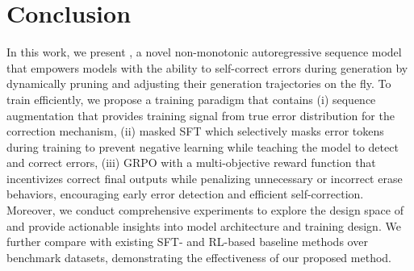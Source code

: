 \section{Conclusion}

In this work, we present \modelname, a novel non-monotonic autoregressive sequence model that empowers models with the ability to self-correct errors during generation by dynamically pruning and adjusting their generation trajectories on the fly.
To train \modelname efficiently, we propose a training paradigm that contains (i) sequence augmentation that provides training signal from true error distribution for the correction mechanism, (ii) masked SFT which selectively masks error tokens during training to prevent negative learning while teaching the model to detect and correct errors, (iii) GRPO with a multi-objective reward function that incentivizes correct final outputs while penalizing
unnecessary or incorrect erase behaviors, encouraging early error detection
and efficient self-correction.
Moreover, we conduct comprehensive experiments to explore the design space of \modelname and provide actionable insights into model architecture and training design. 
We further compare \modelname with existing SFT- and RL-based baseline methods over benchmark datasets, demonstrating the effectiveness of our proposed method.